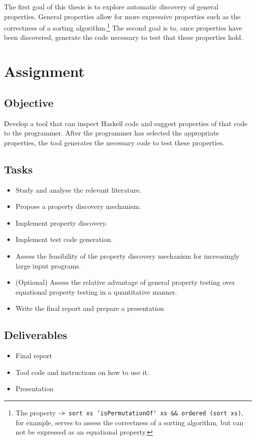 \documentclass[a4paper, 11pt]{article}
\begin{document}
The first goal of this thesis is to explore automatic discovery of general properties.
General properties allow for more expressive properties such as the correctness of a sorting algorithm.\footnote{The property \texttt{\xs -> sort xs `isPermutationOf` xs && ordered (sort xs)}, for example, serves to assess the correctness of a sorting algorithm, but can not be expressed as an equational property.}
The second goal is to, once properties have been discovered, generate the code necessary to test that these properties hold.

\newpage

\section{Assignment}
\subsection{Objective}
Develop a tool that can inspect Haskell code and suggest properties of that code to the programmer.
After the programmer has selected the appropriate properties, the tool generates the necessary code to test these properties.

\subsection{Tasks}

\begin{itemize}
    \item Study and analyse the relevant literature.
    \item Propose a property discovery mechanism.
    \item Implement property discovery.
    \item Implement test code generation.
    \item Assess the feasibility of the property discovery mechanism for increasingly large input programs.
    \item (Optional) Assess the relative advantage of general property testing over equational property testing in a quantitative manner.
    \item Write the final report and prepare a presentation
\end{itemize}


\subsection{Deliverables}

\begin{itemize}
    \item Final report
    \item Tool code and instructions on how to use it.
    \item Presentation
\end{itemize}



\end{document}
